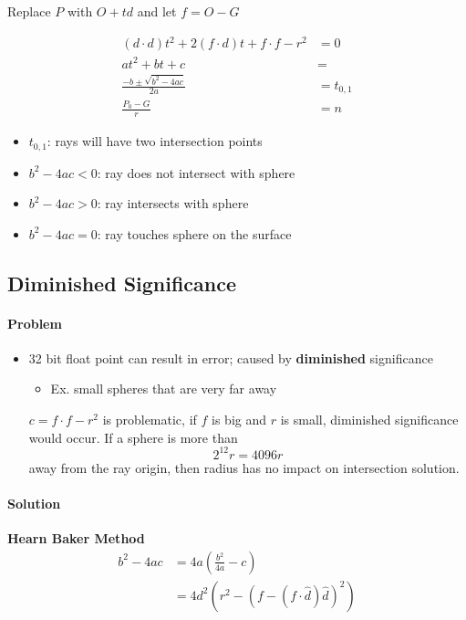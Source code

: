   Replace $ P $ with $ O + td $ and let $ f = O - G  $

  \begin{align}
    \left( d \cdot d \right) t^{2}
      + 2 \left( f \cdot d \right) t
      + f \cdot f - r^{2}
    &= 0 \\
    a t^{2} + bt + c &= \\
    \frac{-b \pm \sqrt{b^{2} - 4ac}}{2a} &= t_{0, 1} \\
    \frac{P_{0} - G}{r} &= n
  \end{align}

  \begin{itemize}
    \item $ t_{0, 1} $: rays will have two intersection points
    \item $ b^{2} - 4ac < 0 $: ray does not intersect with sphere
    \item $ b^{2} - 4ac > 0 $: ray intersects with sphere
    \item $ b^{2} - 4ac = 0 $: ray touches sphere on the surface
  \end{itemize}

  \subsection{Diminished Significance}

    \paragraph{Problem}
    \begin{itemize}
      \item 32 bit float point can result in error; caused by
      \textbf{diminished} significance
      \begin{itemize}
        \item Ex. small spheres that are very far away
      \end{itemize}

      $ c = f \cdot f - r^{2}  $ is problematic, if $ f $ is big and $ r $ is
      small, diminished significance would occur. If a sphere is more than
      \begin{equation}
        2^{12} r = 4096 r
      \end{equation}
      away from the ray origin, then radius has no impact on intersection
      solution.
    \end{itemize}

    \paragraph{Solution} \textbf{Hearn Baker Method}
    \begin{align}
      b^{2} - 4ac &= 4a \left( \frac{b^{2}}{4a} - c \right) \\
      &= 4d^{2} \left( r^{2} - \left( f - \left( f \cdot \hat{d} \right) \hat{d} \right)^{2} \right)
    \end{align}

